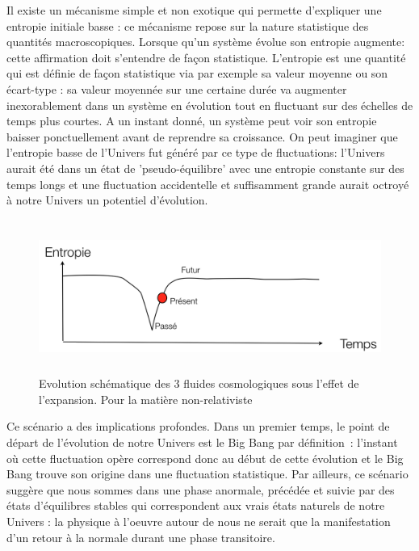 Il existe un mécanisme simple et non exotique qui permette d'expliquer une entropie initiale basse : ce mécanisme repose sur la nature statistique des quantités macroscopiques. Lorsque qu'un système évolue son entropie augmente: cette affirmation doit s'entendre de façon statistique. L'entropie est une quantité qui est définie de façon statistique via par exemple sa valeur moyenne ou son écart-type : sa valeur moyennée sur une certaine durée va augmenter inexorablement dans un système en évolution tout en fluctuant sur des échelles de temps plus courtes. A un instant donné, un système peut voir son entropie baisser ponctuellement avant de reprendre sa croissance. On peut imaginer que l'entropie basse de l'Univers fut généré par ce type de fluctuations: l'Univers aurait été dans un état de 'pseudo-équilibre' avec une entropie constante sur des temps longs et une fluctuation accidentelle et suffisamment grande aurait octroyé à notre Univers un potentiel d'évolution.
\begin{figure}[htbp]
	\centering
		\includegraphics[height=5cm]{figs/fluctuation.png}
	\caption{Evolution schématique des 3 fluides cosmologiques sous l'effet de l'expansion. Pour la matière non-relativiste}
	\label{f:fluctuation}
\end{figure}
Ce scénario a des implications profondes. Dans un premier temps, le point de départ de l'évolution de notre Univers est le Big Bang par définition~: l'instant où cette fluctuation opère correspond donc au début de cette évolution et le Big Bang trouve son origine dans une fluctuation statistique. Par ailleurs, ce scénario suggère que nous sommes dans une phase anormale, précédée et suivie par des états d'équilibres stables qui correspondent aux vrais états naturels de notre Univers : la physique à l'oeuvre autour de nous ne serait que la manifestation d'un retour à la normale durant une phase transitoire.


